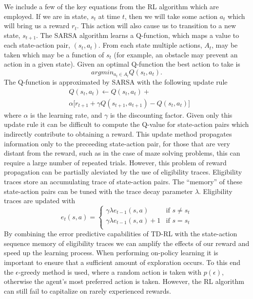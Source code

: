 We include a few of the key equations from the RL algorithm which are employed. If we are in state,
$s_t$ at time $t$, then we will take some action $a_t$ which will bring us a
reward $r_t$. This action will also cause us to transition to a new state,
$s_{t+1}$. The SARSA algorithm learns a Q-function, which maps a value to each 
state-action pair, $(s_t,a_t)$. From each state multiple actions, $A_t$, may be taken
which may be a function of $s_t$ (for example, an obstacle may prevent an action
in a given state). Given an optimal Q-function the best action to take is
\begin{equation} argmin_{a_t \in A_t} Q(s_t,a_t).
\end{equation}
\noindent The Q-function is approximated by SARSA with the following update rule
\begin{eqnarray} 
& Q(s_t,a_t) \leftarrow Q(s_t,a_t)+ \nonumber \\ 
& \alpha \big[r_{t+1}+\gamma Q(s_{t+1},a_{t+1}) - Q(s_t,a_t)\big] 
\end{eqnarray}
\noindent where $\alpha$ is the learning rate, and $\gamma$ is the discounting
factor. Given only this update rule it can be difficult to compute the Q-value
for state-action pairs which indirectly contribute to obtaining a reward. This
update method propagates information only to the preceeding state-action pair,
for those that are very distant from the reward, such as in the case of maze
solving problems, this can require a large number of repeated trials. However,
this problem of reward propagation can be partially aleviated by the use of
eligibility traces. Eligibility traces store an accumulating trace of
state-action pairs. The ``memory'' of these state-action pairs can be tuned with
the trace decay parameter $\lambda$. Eligibility traces are updated with
\begin{equation}
e_t(s,a) = 	\begin{cases}
			\gamma \lambda e_{t-1}(s,a) & \mbox{if } s \neq s_t \\ 
			\gamma \lambda e_{t-1}(s,a)+1 & \mbox{if }s = s_t \\
			\end{cases}
\end{equation} 
\noindent By combining the error predictive capabilities of TD-RL with the
state-action sequence memory of eligibility traces we can amplify the effects
of our reward and speed up the learning process. When performing on-policy
learning it is important to ensure that a sufficient amount of exploration
occurs. To this end the $\epsilon$-greedy method is used, where a random
action is taken with $p(\epsilon)$, otherwise the agent's most preferred 
action is taken. However, the RL algorithm can still fail to capitalize on rarely
experienced rewards. 